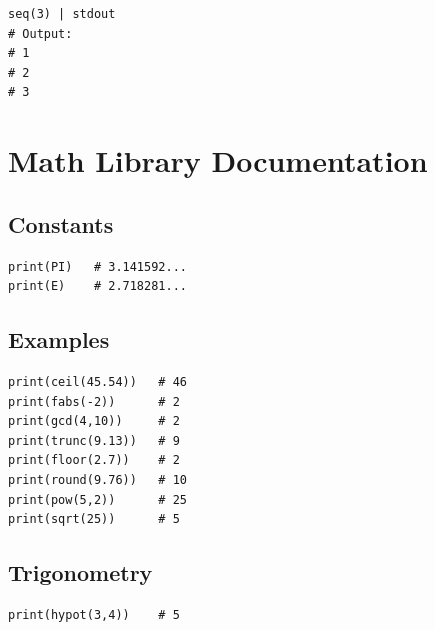 \documentclass[12pt,a4paper]{article}
\begin{document}
\begin{lstlisting}[style=streem]
seq(3) | stdout
# Output:
# 1
# 2
# 3
\end{lstlisting}

\section{Math Library Documentation}

\subsection{Constants}

\begin{lstlisting}[style=streem]
print(PI)   # 3.141592...
print(E)    # 2.718281...
\end{lstlisting}

\subsection{Examples}

\begin{lstlisting}[style=streem]
print(ceil(45.54))   # 46
print(fabs(-2))      # 2
print(gcd(4,10))     # 2
print(trunc(9.13))   # 9
print(floor(2.7))    # 2
print(round(9.76))   # 10
print(pow(5,2))      # 25
print(sqrt(25))      # 5
\end{lstlisting}

\subsection{Trigonometry}

\begin{lstlisting}[style=streem]
print(hypot(3,4))    # 5
\end{lstlisting}
\end{document}
